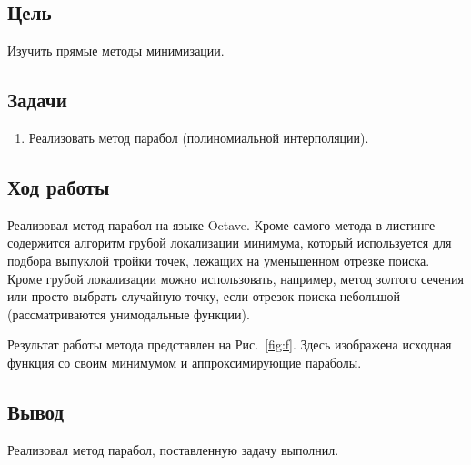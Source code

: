 



\newcommand{\labn}{3}


\subsection*{Цель}

Изучить прямые методы минимизации.

\subsection*{Задачи}

\begin{enumerate}
    \item Реализовать метод парабол (полиномиальной интерполяции).
\end{enumerate}

\subsection*{Ход работы}

Реализовал метод парабол на языке Octave. Кроме самого метода 
в листинге содержится алгоритм грубой локализации минимума, который используется для подбора выпуклой тройки точек, лежащих на 
уменьшенном отрезке поиска. Кроме грубой локализации можно использовать, например, метод золтого сечения или просто выбрать случайную точку, если
отрезок поиска небольшой (рассматриваются унимодальные функции).

Результат работы метода представлен на Рис.~\ref{fig:f}.
Здесь изображена исходная функция со своим минимумом и аппроксимирующие параболы.

\subsection*{Вывод}

Реализовал метод парабол, поставленную задачу выполнил.


